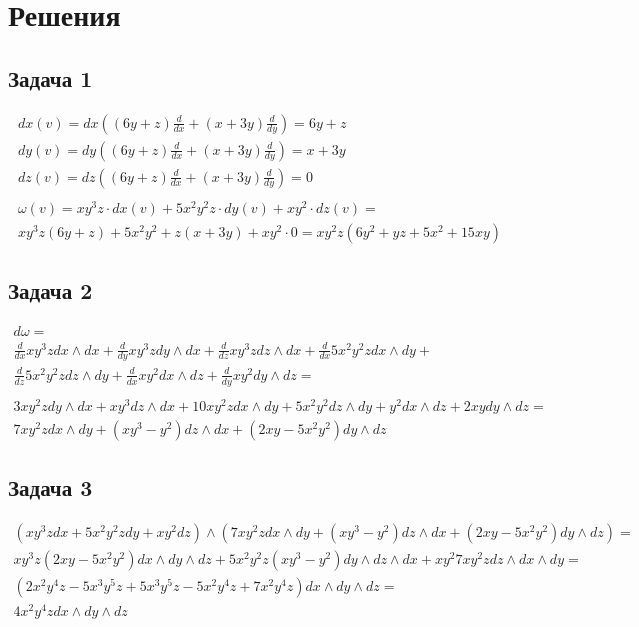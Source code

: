 
\newpage
\section*{Решения}
\subsection*{Задача 1}
	\begin{gather*}
	dx(v) = dx((6y + z)\frac{d}{d x} + (x+3y)\frac{d}{d y}) = 6y + z\\
	dy(v) = dy((6y + z)\frac{d}{d x} + (x+3y)\frac{d}{d y}) = x + 3y\\
	dz(v) = dz((6y + z)\frac{d}{d x} + (x+3y)\frac{d}{d y}) = 0\\
	\\
	\omega (v) = xy^3z \cdot dx(v) + 5x^2y^2z \cdot dy(v) + xy^2 \cdot dz(v) =\\
	xy^3 z(6y + z) + 5x^2 y^2 + z(x + 3y) + xy^2 \cdot 0 =
	xy^2 z(6y^2 + yz + 5x^2 + 15xy)
	\end{gather*}
\vskip 0.4in


\subsection*{Задача 2}
	\begin{gather*}
	d \omega = \\
	\frac{d}{d x} xy^3 z dx \wedge dx + \frac{d}{dy} xy^3z dy \wedge dx +
	\frac{d}{dz}xy^3 z dz \wedge dx + \frac{d}{dx} 5x^2 y^2 z dx \wedge dy +\\
	\frac{d}{dz} 5x^2 y^2 z dz \wedge dy + \frac{d}{dx} xy^2 dx \wedge dz +
	\frac{d}{dy} xy^2 dy \wedge dz =\\
	\\
	3xy^2 z dy \wedge dx + xy^3 dz \wedge dx + 10xy^2 z dx \wedge dy + 5x^2 y^2 dz \wedge dy + y^2 dx \wedge dz + 2xy dy \wedge dz =\\
	7xy^2 z dx \wedge dy + (xy^3 - y^2) dz \wedge dx + (2xy - 5x^2 y^2) dy \wedge dz
	\end{gather*}
\vskip 0.4in


\subsection*{Задача 3}
	\begin{gather*}
	(xy^3z dx + 5x^2 y^2z dy + xy^2 dz) \wedge (7xy^2z dx \wedge dy +(xy^3 - y^2)dz \wedge dx +(2xy - 5x^2y^2)dy \wedge dz) =\\
	xy^3 z(2xy - 5x^2 y^2) dx \wedge dy \wedge dz + 5x^2 y^2 z (xy^3 - y^2) dy \wedge dz \wedge dx +
	xy^2 7xy^2z dz \wedge dx \wedge dy =\\
	(2x^2 y^4 z - 5x^3 y^5 z + 5x^3 y^5 z - 5x^2 y^4 z + 7x^2 y^4 z) dx \wedge dy \wedge dz =\\
	4x^2 y^4 z dx \wedge dy \wedge dz
	\end{gather*}
\vskip 0.4in


